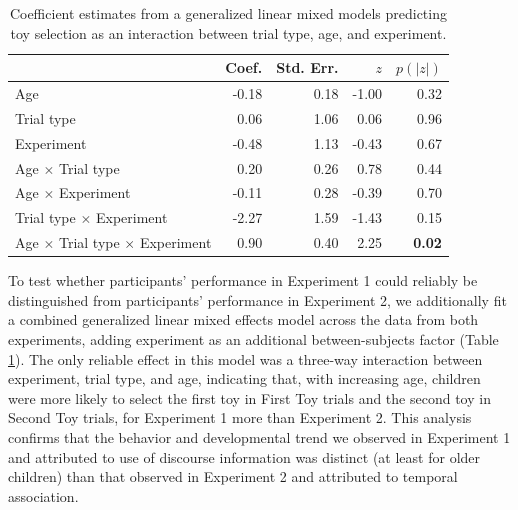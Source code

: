 \documentclass[man]{apa2}
\begin{document}
  \begin{table} [t]
   \caption{Coefficient estimates from a generalized linear mixed models predicting toy selection as an interaction between trial type, age, and experiment.
   \label{tab:coefficient_estimates_full} } 
   \begin{center} 
     \begin{tabular}{lrrrr} 
       \hline 
       \null  & Coef. & Std. Err. & $z$  &  $p(|z|)$ \\
       \hline  
        Age                                                                     & -0.18 &  0.18 & -1.00 & 0.32 \\
        Trial type                                                            & 0.06 &1.06 &  0.06 & 0.96 \\
        Experiment                                                         & -0.48 & 1.13 &  -0.43 & 0.67 \\
        Age $\times$ Trial type                                      & 0.20 & 0.26 & 0.78 & 0.44\\ 
        Age $\times$ Experiment                                   & -0.11 & 0.28 & -0.39 & 0.70\\ 
        Trial type $\times$ Experiment                          & -2.27 & 1.59 & -1.43 & 0.15 \\ 
        Age $\times$ Trial type $\times$ Experiment    & 0.90 & 0.40 & 2.25 & {\bf 0.02} \\ 
       \hline 
     \end{tabular} 
  \end{center}
 \end{table}
 
To test whether participants' performance in Experiment 1 could reliably be distinguished from participants' performance in Experiment 2, we additionally fit a combined generalized linear mixed effects model across the data from both experiments, adding experiment as an additional between-subjects factor (Table \ref{tab:coefficient_estimates_full}).  The only reliable effect in this model was a three-way interaction between experiment, trial type, and age, indicating that, with increasing age, children were more likely to select the first toy in First Toy trials and the second toy in Second Toy trials, for Experiment 1 more than Experiment 2. This analysis confirms that the behavior and developmental trend we observed in Experiment 1 and attributed to use of discourse information was distinct (at least for older children) than that observed in Experiment 2 and attributed to temporal association.
\end{document}
